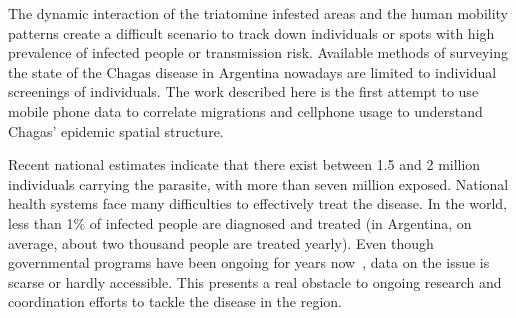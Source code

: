 The dynamic interaction of the triatomine infested areas and the human mobility patterns create a difficult scenario to track down individuals or spots with high prevalence of infected people or transmission risk. Available methods of surveying the state of the Chagas disease in Argentina nowadays are limited to individual screenings of individuals. The work described here is the first attempt to use mobile phone data to correlate migrations and cellphone usage to understand Chagas’ epidemic spatial structure.

Recent national estimates indicate that there exist between 1.5 and 2 million individuals carrying the parasite, with more than seven million exposed. 
National health systems face many difficulties to effectively treat the disease. In the world, less than 1\% of infected people are diagnosed and treated (in Argentina, on average, about two thousand people are treated yearly). 
Even though governmental programs have been ongoing for years now~\cite{plan_nacional_chagas}, data on the issue is scarse or hardly accessible. This presents a real obstacle to ongoing research and coordination efforts to tackle the disease in the region.

